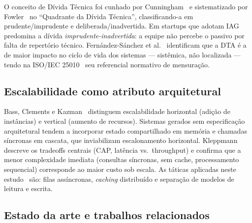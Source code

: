 \documentclass[sigconf]{acmart}
\begin{document}
O conceito de Dívida Técnica foi cunhado por Cunningham~\cite{Cunningham1992} e
sistematizado por Fowler~\cite{Fowler2018} no ``Quadrante da Dívida Técnica'',
classificando-a em prudente/imprudente e deliberada/inadvertida. Em startups que
adotam IAG predomina a dívida \textit{imprudente-inadvertida}: a equipe não percebe
o passivo por falta de repertório técnico. Fernández-Sánchez et
al.~\cite{FernandezSanchez2020} identificam que a DTA é a de maior impacto no ciclo
de vida dos sistemas --- sistêmica, não localizada --- tendo na ISO/IEC
25010~\cite{ISO25010} seu referencial normativo de mensuração.

\subsection{Escalabilidade como atributo arquitetural}

Bass, Clements e Kazman~\cite{Bass2021} distinguem escalabilidade horizontal
(adição de instâncias) e vertical (aumento de recursos). Sistemas gerados sem
especificação arquitetural tendem a incorporar estado compartilhado em memória e
chamadas síncronas em cascata, que inviabilizam escalonamento horizontal.
Kleppmann~\cite{Kleppmann2017} descreve os tradeoffs centrais (CAP, latência vs.\
throughput) e confirma que a menor complexidade imediata (consultas síncronas, sem
cache, processamento sequencial) corresponde ao maior custo sob escala. As táticas
aplicadas neste estudo~\cite{Bass2021} são: filas assíncronas, \textit{caching}
distribuído e separação de modelos de leitura e escrita.

\subsection{Estado da arte e trabalhos relacionados}
\end{document}
